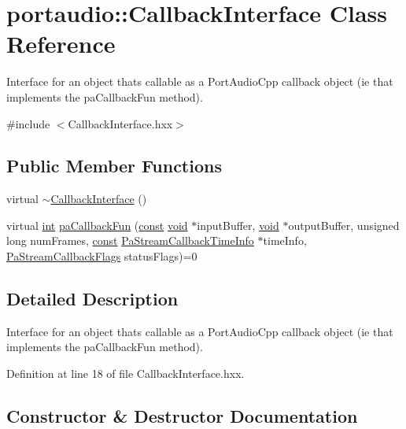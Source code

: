 \hypertarget{classportaudio_1_1_callback_interface}{}\section{portaudio\+:\+:Callback\+Interface Class Reference}
\label{classportaudio_1_1_callback_interface}


Interface for an object that\textquotesingle{}s callable as a Port\+Audio\+Cpp callback object (ie that implements the pa\+Callback\+Fun method).  




{\ttfamily \#include $<$Callback\+Interface.\+hxx$>$}

\subsection*{Public Member Functions}
\begin{DoxyCompactItemize}
\item 
virtual \hyperlink{classportaudio_1_1_callback_interface_aff738795256daba5ca89efeebf155203}{$\sim$\+Callback\+Interface} ()
\item 
virtual \hyperlink{xmltok_8h_a5a0d4a5641ce434f1d23533f2b2e6653}{int} \hyperlink{classportaudio_1_1_callback_interface_a33607387b7d2cd30afd5bbea4a7389a8}{pa\+Callback\+Fun} (\hyperlink{getopt1_8c_a2c212835823e3c54a8ab6d95c652660e}{const} \hyperlink{sound_8c_ae35f5844602719cf66324f4de2a658b3}{void} $\ast$input\+Buffer, \hyperlink{sound_8c_ae35f5844602719cf66324f4de2a658b3}{void} $\ast$output\+Buffer, unsigned long num\+Frames, \hyperlink{getopt1_8c_a2c212835823e3c54a8ab6d95c652660e}{const} \hyperlink{struct_pa_stream_callback_time_info}{Pa\+Stream\+Callback\+Time\+Info} $\ast$time\+Info, \hyperlink{portaudio_8h_a55a005924bcfa0424594f4f65cd4ae82}{Pa\+Stream\+Callback\+Flags} status\+Flags)=0
\end{DoxyCompactItemize}


\subsection{Detailed Description}
Interface for an object that\textquotesingle{}s callable as a Port\+Audio\+Cpp callback object (ie that implements the pa\+Callback\+Fun method). 

Definition at line 18 of file Callback\+Interface.\+hxx.



\subsection{Constructor \& Destructor Documentation}
